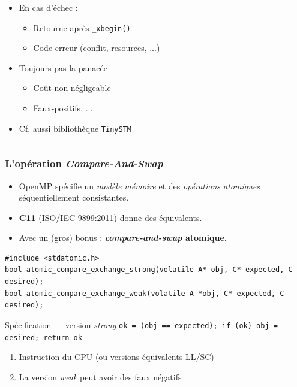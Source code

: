\documentclass[xcolor={x11names,svgnames}]{beamer}
\begin{document}
\begin{frame}[fragile, label=rtm]
\begin{columns}
\begin{column}{0.63\textwidth}
\begin{itemize}
    \medskip

  \item \alert{En cas d'échec} :
    \begin{itemize}
    \item Retourne après \verb|_xbegin()|
    \item Code erreur (conflit, resources, ...)
    \end{itemize}

    \medskip

  \item Toujours pas la panacée
    \begin{itemize}
    \item Coût non-négligeable
    \item Faux-positifs, ...
    \end{itemize}

    \medskip

  \item Cf. aussi bibliothèque \texttt{TinySTM}
  \end{itemize}
\end{column}
\end{columns}
\end{frame}


\begin{frame}[fragile, label=CAS]
  \frametitle{L'opération \emph{Compare-And-Swap}}

  \small
  \begin{itemize}
  \item OpenMP spécifie un \emph{modèle mémoire} et des \emph{opérations
      atomiques} séquentiellement consistantes.
  \item \textbf{C11} (ISO/IEC 9899:2011) donne des équivalents.
  \item Avec un (gros) bonus : \textbf{\emph{compare-and-swap} \alert{atomique}}.
  \end{itemize}

\medskip
  
\begin{verbatim}
#include <stdatomic.h>
bool atomic_compare_exchange_strong(volatile A* obj, C* expected, C desired);
bool atomic_compare_exchange_weak(volatile A *obj, C* expected, C desired);
\end{verbatim}

\medskip

\begin{block}{Spécification --- version \emph{strong}}
  \texttt{ok = (obj == expected); if (ok) obj = desired; return ok}%
\end{block}

\medskip

\begin{enumerate}
\item Instruction du CPU (ou versions équivalents LL/SC)
\item La version \emph{weak} peut avoir des faux négatifs
\end{enumerate}

\end{frame}
\end{document}
